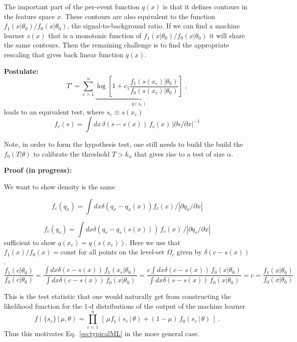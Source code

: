\documentclass[11pt, oneside]{article}   	%
\begin{document}
The important part of the per-event function $q(x)$ is that it defines contours in the feature space $x$. These contours are also equivalent to the function $f_1(x|\theta_0)/f_0(x|\theta_0)$, the signal-to-background ratio. If we can find a machine learner $s(x)$ that is a monotonic function of $f_1(x|\theta_0)/f_0(x|\theta_0)$ it will share the same contours. Then the remaining challenge is to find the appropriate rescaling that gives back  linear function $q(x)$. 

\textbf{Postulate:}
\[
T' = \sum_{e=1}^n \underbrace{\log \left[ 1+c_1\frac {f_1(s(x_e) | \theta_0) }{ f_0(s(x_e) | \theta_0) } \right]}_{q(s_e)} \;,
\]
leads to an equivalent test, where $s_e \equiv s(x_e)$
\[
f_c(s) = \int dx \, \delta(s-s(x)) \, f_c(x)  \,  |\partial s / \partial x|^{-1}
\]



Note, in order to form the hypothesis test, one still needs to build the build the $f_0(T|\theta)$ to calibrate the threshold  $T>k_\alpha$ that gives rise to a test of size $\alpha$. 



\textbf{Proof (in progress):}

We want to show density is the same 

\[
f_c(q_x) = \int dx \delta(q_x-q_x(x)) f_c(x) / |\partial q_x / \partial x|
\]

\[
f_c(q_s) = \int dx \delta(q_s-q_s(s(x))) \, f_c(x) \, / |\partial q_s / \partial x|
\]
sufficient to show $q(x_e) = q(s(x_e))$.  Here we use that $f_1(x)/f_0(x)=\textrm{const}$ for all points on the level-set $\Omega_c$ given by $ \delta(c-s(x))$. 
\[
\frac {f_1(c | \theta_0) }{ f_0(c | \theta_0) } = 
\frac { \int dx \delta(c-s(x)) \, f_1(x_e | \theta_0) }{ \int dx \delta(c-s(x)) \, f_0(x | \theta_0)  } = 
\frac {c \int dx \delta(c-s(x)) \, f_0(x | \theta_0)  }{ \int dx \delta(s-s(x)) \, f_0(x | \theta_0)  } = c =\frac {f_1(x | \theta_0) }{ f_0(x | \theta_0) } 
\]





This is the test statistic that one would naturally get from constructing the likelihood function for the 1-d distributions of the output of the machine learner
\begin{equation}\label{eq:NP}
f( \{s_e\} \,|\, \mu, \theta) = \prod_{e=1}^n \, \left[\, \mu f_1( s_e \, |\,  \theta)  + (1-\mu)\, f_0( s_e \,|\, \theta) \,\right] \; .
\end{equation}
Thus this motivates Eq.~\ref{eq:typicalML} in the more general case. 
\end{document}
